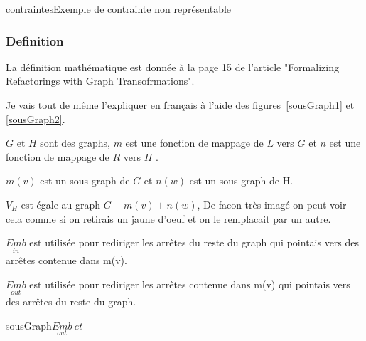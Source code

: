 \documentclass[a4paper, 12pt]{article}
\begin{document}
\begin{figu}{contraintes}{Exemple de contrainte non représentable}
\subsubsection{Definition}

La définition mathématique est donnée à la page 15 de l'article "Formalizing Refactorings with Graph Transofrmations".

Je vais tout de même l'expliquer en français à l'aide des figures~\ref{sousGraph1} et \ref{sousGraph2}.

\(G\) et \(H\)  sont des graphs, \(m\) est une fonction de mappage de \(L\) vers \(G\) et \(n\) est une fonction de mappage de \(R\)  vers \(H\) .

\(m(v)\) est un sous graph de \(G\) et \(n(w)\) est un sous graph de H.

{$V_H$} est égale au graph \(G - m(v) + n(w)\), De facon très imagé on peut voir cela comme si on retirais un jaune d'oeuf et on le remplacait par un autre.

$\underset{in}{Emb}$ est utilisée pour rediriger les arrêtes du reste du graph qui pointais vers des arrêtes contenue dans m(v).

$\underset{out}{Emb}$ est utilisée pour rediriger les arrêtes contenue dans m(v) qui pointais vers des arrêtes du reste du graph.

\begin{myfig}{sousGraph}{$\underset{out}{Emb} ~ et ~ $}
\tikzset{>=latex}
\end{myfig}
\end{figu}
\end{document}
